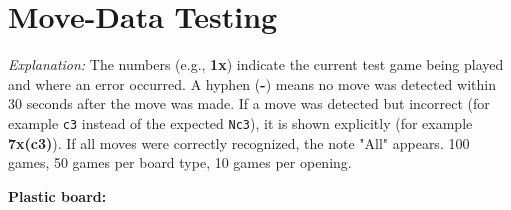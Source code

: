\chapter{Move-Data Testing}
\label{app:move-data-testing}


\par\scriptsize
\textit{Explanation:} The numbers (e.g., \textbf{1x}) indicate the current test game being played and where an error occurred. A hyphen (\textbf{-}) means no move was detected within 30 seconds after the move was made. If a move was detected but incorrect (for example \texttt{c3} instead of the expected \texttt{Nc3}), it is shown explicitly (for example \textbf{7x(c3)}). If all moves were correctly recognized, the note "All" appears. 100 games, 50 games per board type, 10 games per opening.

\normalsize %

\begin{center}
\footnotesize  %
\textbf{Plastic board:}
\end{center}

